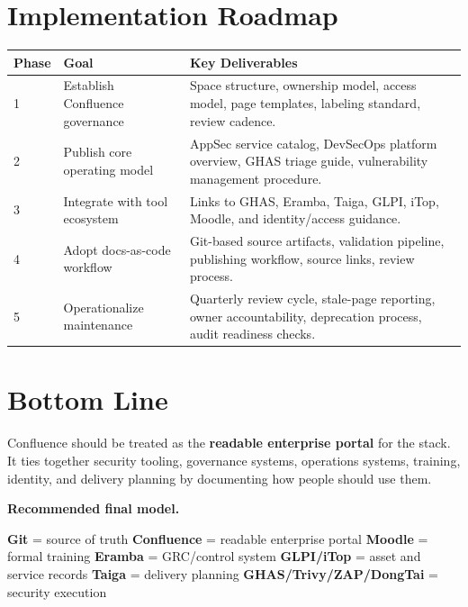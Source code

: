 \documentclass[10pt,letterpaper]{article}
\begin{document}
\section{Implementation Roadmap}

\begin{longtable}{L{1.1in} L{2.1in} L{3.55in}}
\toprule
\textbf{Phase} & \textbf{Goal} & \textbf{Key Deliverables} \\
 & Establish Confluence governance & Space structure, ownership model, access model, page templates, labeling standard, review cadence. \\
2 & Publish core operating model & AppSec service catalog, DevSecOps platform overview, GHAS triage guide, vulnerability management procedure. \\
3 & Integrate with tool ecosystem & Links to GHAS, Eramba, Taiga, GLPI, iTop, Moodle, and identity/access guidance. \\
4 & Adopt docs-as-code workflow & Git-based source artifacts, validation pipeline, publishing workflow, source links, review process. \\
5 & Operationalize maintenance & Quarterly review cycle, stale-page reporting, owner accountability, deprecation process, audit readiness checks. \\
\bottomrule
\end{longtable}

\section{Bottom Line}

Confluence should be treated as the \textbf{readable enterprise portal} for the stack. It ties together security tooling, governance systems, operations systems, training, identity, and delivery planning by documenting how people should use them.

\begin{summarybox}
\textbf{Recommended final model.}
\begin{center}
\textbf{Git} = source of truth \quad
\textbf{Confluence} = readable enterprise portal \quad
\textbf{Moodle} = formal training \quad
\textbf{Eramba} = GRC/control system \quad
\textbf{GLPI/iTop} = asset and service records \quad
\textbf{Taiga} = delivery planning \quad
\textbf{GHAS/Trivy/ZAP/DongTai} = security execution
\end{center}
\end{summarybox}
\end{document}
